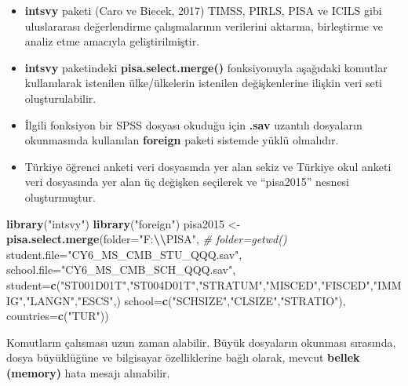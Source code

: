 \documentclass[
  oneside]{book}
\newenvironment{Shaded}{\begin{snugshade}}{\end{snugshade}}
\newcommand{\AttributeTok}[1]{\textcolor[rgb]{0.13,0.29,0.53}{#1}}
\newcommand{\CommentTok}[1]{\textcolor[rgb]{0.56,0.35,0.01}{\textit{#1}}}
\newcommand{\FunctionTok}[1]{\textcolor[rgb]{0.13,0.29,0.53}{\textbf{#1}}}
\newcommand{\NormalTok}[1]{#1}
\newcommand{\OtherTok}[1]{\textcolor[rgb]{0.56,0.35,0.01}{#1}}
\newcommand{\SpecialCharTok}[1]{\textcolor[rgb]{0.81,0.36,0.00}{\textbf{#1}}}
\newcommand{\StringTok}[1]{\textcolor[rgb]{0.31,0.60,0.02}{#1}}
\begin{document}
\begin{itemize}
\item
  \textbf{intsvy} paketi (Caro ve Biecek, 2017) TIMSS, PIRLS, PISA ve ICILS gibi uluslararası değerlendirme çalışmalarının verilerini aktarma, birleştirme ve analiz etme amacıyla geliştirilmiştir.
\item
  \textbf{intsvy} paketindeki \textbf{pisa.select.merge()} fonksiyonuyla aşağıdaki komutlar kullanılarak istenilen ülke/ülkelerin istenilen değişkenlerine ilişkin veri seti oluşturulabilir.
\item
  İlgili fonksiyon bir SPSS dosyası okuduğu için \textbf{.sav} uzantılı dosyaların okunmasında kullanılan \textbf{foreign} paketi sistemde yüklü olmalıdır.
\item
  Türkiye öğrenci anketi veri dosyasında yer alan sekiz ve Türkiye okul anketi veri dosyasında yer alan üç değişken seçilerek ve ``pisa2015'' nesnesi oluşturmuştur.
\end{itemize}

\begin{Shaded}
\begin{Highlighting}[]
\FunctionTok{library}\NormalTok{(}\StringTok{"intsvy"}\NormalTok{)}
\FunctionTok{library}\NormalTok{(}\StringTok{"foreign"}\NormalTok{)}
\NormalTok{pisa2015 }\OtherTok{\textless{}{-}} \FunctionTok{pisa.select.merge}\NormalTok{(}\AttributeTok{folder=}\StringTok{"F:}\SpecialCharTok{\textbackslash{}\textbackslash{}}\StringTok{PISA"}\NormalTok{, }\CommentTok{\# folder=getwd()}
\AttributeTok{student.file=}\StringTok{"CY6\_MS\_CMB\_STU\_QQQ.sav"}\NormalTok{,}
\AttributeTok{school.file=}\StringTok{"CY6\_MS\_CMB\_SCH\_QQQ.sav"}\NormalTok{,}
\AttributeTok{student=}\FunctionTok{c}\NormalTok{(}\StringTok{"ST001D01T"}\NormalTok{,}\StringTok{"ST004D01T"}\NormalTok{,}\StringTok{"STRATUM"}\NormalTok{,}\StringTok{"MISCED"}\NormalTok{,}\StringTok{"FISCED"}\NormalTok{,}\StringTok{"IMMIG"}\NormalTok{,}\StringTok{"LANGN"}\NormalTok{,}\StringTok{"ESCS"}\NormalTok{,)}
\AttributeTok{school=}\FunctionTok{c}\NormalTok{(}\StringTok{"SCHSIZE"}\NormalTok{,}\StringTok{"CLSIZE"}\NormalTok{,}\StringTok{"STRATIO"}\NormalTok{),}
  \AttributeTok{countries=}\FunctionTok{c}\NormalTok{(}\StringTok{"TUR"}\NormalTok{))}
\end{Highlighting}
\end{Shaded}

Komutların çalısması uzun zaman alabilir. Büyük dosyaların okunması sırasında, dosya büyüklüğüne ve bilgisayar özelliklerine bağlı olarak, mevcut \textbf{bellek (memory)} hata mesajı alınabilir.
\end{document}
